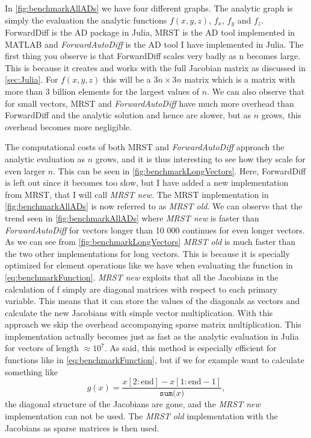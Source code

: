 In \autoref{fig:benchmarkAllADs} we have four different graphs. The analytic graph is simply the evaluation the analytic functions $f(x,y,z)$, $f_x$, $f_y$ and $f_z$. ForwardDiff is the AD package in Julia, MRST is the AD tool implemented in MATLAB and \textit{ForwardAutoDiff} is the AD tool I have implemented in Julia. The first thing you observe is that ForwardDiff scales very badly as n becomes large. This is because it creates and works with the full Jacobian matrix as discussed in \autoref{sec:Julia}. For $f(x,y,z)$ this will be a $3n \times 3n$ matrix which is a matrix with more than 3 billion elements for the largest values of $n$. We can also observe that for small vectors, MRST and \textit{ForwardAutoDiff} have much more overhead than ForwardDiff and the analytic solution and hence are slower, but as $n$ grows, this overhead becomes more negligible. 

The computational costs of both MRST and \textit{ForwardAutoDiff} approach the analytic evaluation as $n$ grows, and it is thus interesting to see how they scale for even larger $n$. This can be seen in \autoref{fig:benchmarkLongVectors}. Here, ForwardDiff is left out since it becomes too slow, but I have added a new implementation from MRST, that I will call \textit{MRST new}. The MRST implementation in  \autoref{fig:benchmarkAllADs} is now referred to as \textit{MRST old}. We can observe that the trend seen in \autoref{fig:benchmarkAllADs} where \textit{MRST new} is faster than \textit{ForwardAutoDiff} for vectors longer than 10 000 continues for even longer vectors. As we can see from \autoref{fig:benchmarkLongVectors} \textit{MRST old} is much faster than the two other implementations for long vectors. This is because it is specially optimized for element operations like we have when evaluating the function in \eqref{eq:benchmarkFunction}. \textit{MRST new} exploits that all the Jacobians in the calculation of f simply are diagonal matrices with respect to each primary variable. This means that it can store the values of the diagonals as vectors and calculate the new Jacobians with simple vector multiplication. With this approach we skip the overhead accompanying sparse matrix multiplication. This implementation actually becomes just as fast as the analytic evaluation in Julia for vectors of length $\approx 10^7$. As said, this method is especially efficient for functions like in \eqref{eq:benchmarkFunction}, but if we for example want to calculate something like
\begin{equation}
g(x) = \frac{x\left[2:\text{end}\right] - x\left[1:\text{end}-1\right]}{\texttt{sum(}x\texttt{)}},
\label{eq:differenceFunction}
\end{equation}
the diagonal structure of the Jacobians are gone, and the \textit{MRST new} implementation can not be used. The \textit{MRST old} implementation with the Jacobians as sparse matrices is then used. 


